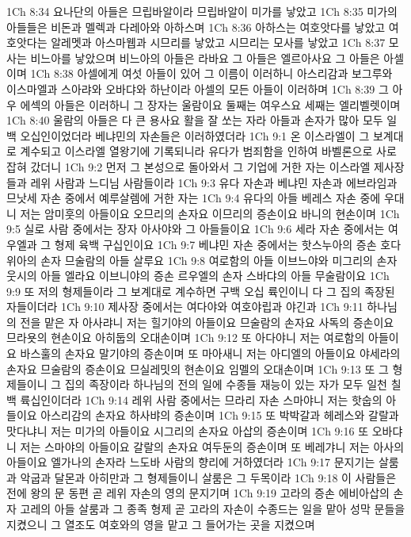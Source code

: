 1Ch 8:34  요나단의 아들은 므립바알이라 므립바알이 미가를 낳았고
1Ch 8:35  미가의 아들들은 비돈과 멜렉과 다레아와 아하스며
1Ch 8:36  아하스는 여호앗다를 낳았고 여호앗다는 알레멧과 아스마웹과 시므리를 낳았고 시므리는 모사를 낳았고
1Ch 8:37  모사는 비느아를 낳았으며 비느아의 아들은 라바요 그 아들은 엘르아사요 그 아들은 아셀이며
1Ch 8:38  아셀에게 여섯 아들이 있어 그 이름이 이러하니 아스리감과 보그루와 이스마엘과 스아랴와 오바댜와 하난이라 아셀의 모든 아들이 이러하며
1Ch 8:39  그 아우 에섹의 아들은 이러하니 그 장자는 울람이요 둘째는 여우스요 세째는 엘리벨렛이며
1Ch 8:40  울람의 아들은 다 큰 용사요 활을 잘 쏘는 자라 아들과 손자가 많아 모두 일백 오십인이었더라 베냐민의 자손들은 이러하였더라
1Ch 9:1  온 이스라엘이 그 보계대로 계수되고 이스라엘 열왕기에 기록되니라 유다가 범죄함을 인하여 바벨론으로 사로잡혀 갔더니
1Ch 9:2  먼저 그 본성으로 돌아와서 그 기업에 거한 자는 이스라엘 제사장들과 레위 사람과 느디님 사람들이라
1Ch 9:3  유다 자손과 베냐민 자손과 에브라임과 므낫세 자손 중에서 예루살렘에 거한 자는
1Ch 9:4  유다의 아들 베레스 자손 중에 우대니 저는 암미훗의 아들이요 오므리의 손자요 이므리의 증손이요 바니의 현손이며
1Ch 9:5  실로 사람 중에서는 장자 아사야와 그 아들들이요
1Ch 9:6  세라 자손 중에서는 여우엘과 그 형제 육백 구십인이요
1Ch 9:7  베냐민 자손 중에서는 핫스누아의 증손 호다위아의 손자 므술람의 아들 살루요
1Ch 9:8  여로함의 아들 이브느야와 미그리의 손자 웃시의 아들 엘라요 이브니야의 증손 르우엘의 손자 스바댜의 아들 무술람이요
1Ch 9:9  또 저의 형제들이라 그 보계대로 계수하면 구백 오십 륙인이니 다 그 집의 족장된 자들이더라
1Ch 9:10  제사장 중에서는 여다야와 여호야립과 야긴과
1Ch 9:11  하나님의 전을 맡은 자 아사랴니 저는 힐기야의 아들이요 므술람의 손자요 사독의 증손이요 므라욧의 현손이요 아히둡의 오대손이며
1Ch 9:12  또 아다야니 저는 여로함의 아들이요 바스훌의 손자요 말기야의 증손이며 또 마아새니 저는 아디엘의 아들이요 야세라의 손자요 므술람의 증손이요 므실레밋의 현손이요 임멜의 오대손이며
1Ch 9:13  또 그 형제들이니 그 집의 족장이라 하나님의 전의 일에 수종들 재능이 있는 자가 모두 일천 칠백 륙십인이더라
1Ch 9:14  레위 사람 중에서는 므라리 자손 스마야니 저는 핫숩의 아들이요 아스리감의 손자요 하사뱌의 증손이며
1Ch 9:15  또 박박갈과 헤레스와 갈랄과 맛다냐니 저는 미가의 아들이요 시그리의 손자요 아삽의 증손이며
1Ch 9:16  또 오바댜니 저는 스마야의 아들이요 갈랄의 손자요 여두둔의 증손이며 또 베레갸니 저는 아사의 아들이요 엘가나의 손자라 느도바 사람의 향리에 거하였더라
1Ch 9:17  문지기는 살룸과 악굽과 달몬과 아히만과 그 형제들이니 살룸은 그 두목이라
1Ch 9:18  이 사람들은 전에 왕의 문 동편 곧 레위 자손의 영의 문지기며
1Ch 9:19  고라의 증손 에비아삽의 손자 고레의 아들 살룸과 그 종족 형제 곧 고라의 자손이 수종드는 일을 맡아 성막 문들을 지켰으니 그 열조도 여호와의 영을 맡고 그 들어가는 곳을 지켰으며
